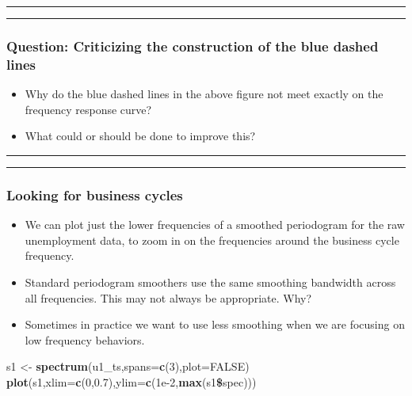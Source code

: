 \documentclass[]{article}
\newenvironment{Shaded}{\begin{snugshade}}{\end{snugshade}}
\newcommand{\KeywordTok}[1]{\textcolor[rgb]{0.13,0.29,0.53}{\textbf{#1}}}
\newcommand{\DataTypeTok}[1]{\textcolor[rgb]{0.13,0.29,0.53}{#1}}
\newcommand{\DecValTok}[1]{\textcolor[rgb]{0.00,0.00,0.81}{#1}}
\newcommand{\FloatTok}[1]{\textcolor[rgb]{0.00,0.00,0.81}{#1}}
\newcommand{\StringTok}[1]{\textcolor[rgb]{0.31,0.60,0.02}{#1}}
\newcommand{\OtherTok}[1]{\textcolor[rgb]{0.56,0.35,0.01}{#1}}
\newcommand{\OperatorTok}[1]{\textcolor[rgb]{0.81,0.36,0.00}{\textbf{#1}}}
\newcommand{\NormalTok}[1]{#1}
\begin{document}
\begin{center}\rule{0.5\linewidth}{\linethickness}\end{center}

\begin{center}\rule{0.5\linewidth}{\linethickness}\end{center}

\subsubsection{Question: Criticizing the construction of the blue dashed
lines}\label{question-criticizing-the-construction-of-the-blue-dashed-lines}

\begin{itemize}
\item
  Why do the blue dashed lines in the above figure not meet exactly on
  the frequency response curve?
\item
  What could or should be done to improve this?
\end{itemize}

\begin{center}\rule{0.5\linewidth}{\linethickness}\end{center}

\begin{center}\rule{0.5\linewidth}{\linethickness}\end{center}

\subsubsection{Looking for business
cycles}\label{looking-for-business-cycles}

\begin{itemize}
\item
  We can plot just the lower frequencies of a smoothed periodogram for
  the raw unemployment data, to zoom in on the frequencies around the
  business cycle frequency.
\item
  Standard periodogram smoothers use the same smoothing bandwidth across
  all frequencies. This may not always be appropriate. Why?
\item
  Sometimes in practice we want to use less smoothing when we are
  focusing on low frequency behaviors.
\end{itemize}

\begin{Shaded}
\begin{Highlighting}[]
\NormalTok{s1 <-}\StringTok{ }\KeywordTok{spectrum}\NormalTok{(u1_ts,}\DataTypeTok{spans=}\KeywordTok{c}\NormalTok{(}\DecValTok{3}\NormalTok{),}\DataTypeTok{plot=}\OtherTok{FALSE}\NormalTok{)}
\KeywordTok{plot}\NormalTok{(s1,}\DataTypeTok{xlim=}\KeywordTok{c}\NormalTok{(}\DecValTok{0}\NormalTok{,}\FloatTok{0.7}\NormalTok{),}\DataTypeTok{ylim=}\KeywordTok{c}\NormalTok{(}\FloatTok{1e-2}\NormalTok{,}\KeywordTok{max}\NormalTok{(s1}\OperatorTok{\$}\NormalTok{spec)))}
\end{Highlighting}
\end{Shaded}
\end{document}
